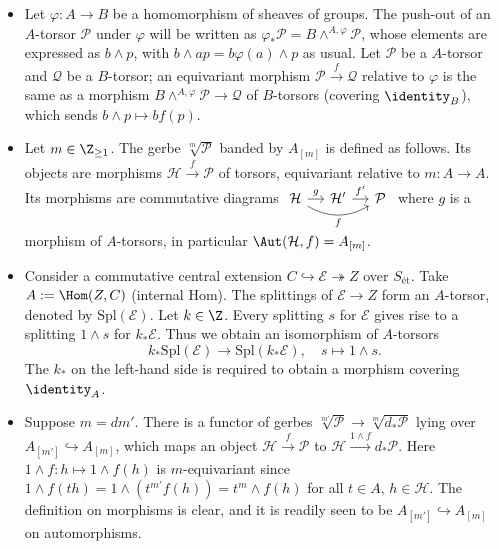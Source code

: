 \documentclass[a4paper,10pt]{article}
\begin{document}
\begin{itemize}
	\item Let $\varphi: A \to B$ be a homomorphism of sheaves of groups. The push-out of an $A$-torsor $\mathcal{P}$ under $\varphi$ will be written as $\varphi_* \mathcal{P} = B \wedge^{A, \varphi} \mathcal{P}$, whose elements are expressed as $b \wedge p$, with $b \wedge ap = b \varphi(a) \wedge p$ as usual. Let $\mathcal{P}$ be a $A$-torsor and $\mathcal{Q}$ be a $B$-torsor; an equivariant morphism $\mathcal{P} \xrightarrow{f} \mathcal{Q}$ relative to $\varphi$ is the same as a morphism $B \wedge^{A,\varphi} \mathcal{P} \to \mathcal{Q}$ of $B$-torsors (covering $\identity_B$), which sends $b \wedge p \mapsto b f(p)$.
	\item Let $m \in \Z_{\geq 1}$. The gerbe $\sqrt[m]{\mathcal{P}}$ banded by $A_{[m]}$ is defined as follows. Its objects are morphisms $\mathcal{H} \xrightarrow{f} \mathcal{P}$ of torsors, equivariant relative to $m: A \to A$. Its morphisms are commutative diagrams
	$\begin{tikzcd}[column sep=small]
		\mathcal{H} \arrow{r}{g} \arrow[bend right]{rr}[swap]{f} & \mathcal{H}' \arrow{r}{f'} & \mathcal{P}
	\end{tikzcd}$ where $g$ is a morphism of $A$-torsors, in particular $\Aut(\mathcal{H}, f) = A_{[m]}$.

	\item Consider a commutative central extension $C \hookrightarrow \mathcal{E} \twoheadrightarrow Z$ over $S_{\text{ét}}$. Take $A := \Hom(Z, C)$ (internal Hom). The splittings of $\mathcal{E} \to Z$ form an $A$-torsor, denoted by $\text{Spl}(\mathcal{E})$. Let $k \in \Z$. Every splitting $s$ for $\mathcal{E}$ gives rise to a splitting $1 \wedge s$ for $k_* \mathcal{E}$. Thus we obtain an isomorphism of $A$-torsors
\[ k_* \text{Spl}(\mathcal{E}) \longrightarrow \text{Spl}(k_* \mathcal{E}), \quad s \mapsto 1 \wedge s. \]
The $k_*$ on the left-hand side is required to obtain a morphism covering $\identity_A$.

	\item Suppose $m = dm'$. There is a functor of gerbes $\sqrt[m']{\mathcal{P}} \to \sqrt[m]{d_* \mathcal{P}}$ lying over $A_{[m']} \hookrightarrow A_{[m]}$, which maps an object $\mathcal{H} \xrightarrow{f} \mathcal{P}$ to $\mathcal{H} \xrightarrow{1 \wedge f} d_* \mathcal{P}$. Here $1 \wedge f: h \mapsto 1 \wedge f(h)$ is $m$-equivariant since $1 \wedge f(th) = 1 \wedge (t^{m'} f(h)) = t^m \wedge f(h)$ for all $t \in A$, $h \in \mathcal{H}$. The definition on morphisms is clear, and it is readily seen to be $A_{[m']} \hookrightarrow A_{[m]}$ on automorphisms.
	

\end{itemize}
\end{document}
